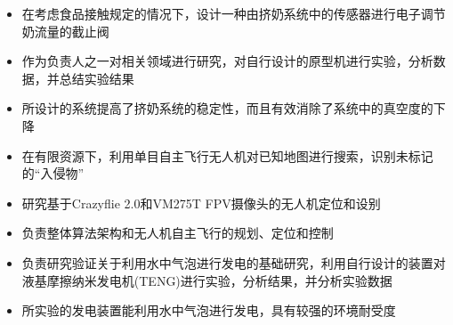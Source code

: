

\begin{itemize}
\small 
  \item 在考虑食品接触规定的情况下，设计一种由挤奶系统中的传感器进行电子调节奶流量的截止阀
  \item 作为负责人之一对相关领域进行研究，对自行设计的原型机进行实验，分析数据，并总结实验结果
  \item 所设计的系统提高了挤奶系统的稳定性，而且有效消除了系统中的真空度的下降
\end{itemize}

\begin{itemize}
\small 
  \item 在有限资源下，利用单目自主飞行无人机对已知地图进行搜索，识别未标记的“入侵物”
  \item 研究基于Crazyflie 2.0和VM275T FPV摄像头的无人机定位和设别
  \item 负责整体算法架构和无人机自主飞行的规划、定位和控制
\end{itemize}

 
\begin{itemize}
\small 
  \item 负责研究验证关于利用水中气泡进行发电的基础研究，利用自行设计的装置对液基摩擦纳米发电机(TENG)进行实验，分析结果，并分析实验数据
  \item 所实验的发电装置能利用水中气泡进行发电，具有较强的环境耐受度
\end{itemize}

